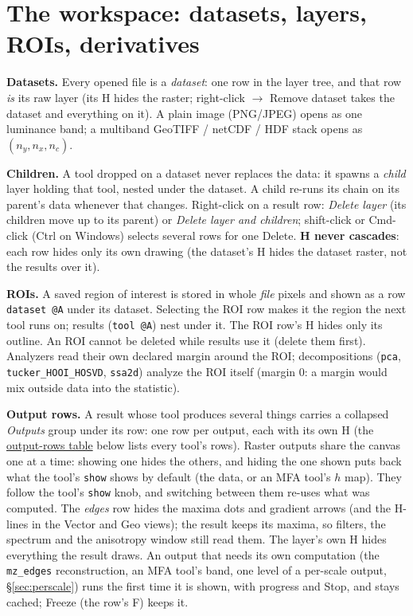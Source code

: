 \documentclass[10pt]{article}
\newcommand{\dev}[1]{\texttt{#1}}
\begin{document}
\tableofcontents

\section{The workspace: datasets, layers, ROIs, derivatives}\label{sec:workspace}

\textbf{Datasets.} Every opened file is a \emph{dataset}: one row in the layer tree, and
that row \emph{is} its raw layer (its H hides the raster; right-click $\to$ Remove dataset
takes the dataset and everything on it). A plain image (PNG/JPEG) opens as one luminance band;
a multiband GeoTIFF / netCDF / HDF stack opens as $(n_y,n_x,n_c)$.

\textbf{Children.} A tool dropped on a dataset never replaces the data: it spawns a
\emph{child} layer holding that tool, nested under the dataset. A child re-runs its chain on
its parent's data whenever that changes. Right-click on a result row: \emph{Delete layer}
(its children move up to its parent) or \emph{Delete layer and children}; shift-click or Cmd-click (Ctrl on Windows)
selects several rows for one Delete. \textbf{H never cascades}: each row hides only its own
drawing (the dataset's H hides the dataset raster, not the results over it).

\textbf{ROIs.} A saved region of interest is stored in whole \emph{file} pixels and shown as
a row \texttt{dataset @A} under its dataset. Selecting the ROI row makes it the region the
next tool runs on; results (\texttt{tool @A}) nest under it. The ROI row's H hides only its
outline. An ROI cannot be deleted while results use it (delete them first). Analyzers read
their own declared margin around the ROI; decompositions (\dev{pca},
\dev{tucker\_HOOI\_HOSVD}, \dev{ssa2d}) analyze the ROI itself (margin $0$: a margin would mix
outside data into the statistic).

\textbf{Output rows.} A result whose tool produces several things carries a collapsed
\emph{Outputs} group under its row: one row per output, each with its own H
(the \hyperref[tab:outputs]{output-rows table} below lists every tool's rows). Raster outputs share the canvas one at a time: showing one
hides the others, and hiding the one shown puts back what the tool's \texttt{show} shows by
default (the data, or an MFA tool's $h$ map). They follow the tool's
\texttt{show} knob, and switching between them re-uses what was computed. The \emph{edges} row
hides the maxima dots and gradient arrows (and the H-lines in the Vector and Geo views); the
result keeps its maxima, so filters, the spectrum and the anisotropy window still read them.
The layer's own H hides everything the result draws. An output that needs its own computation
(the \dev{mz\_edges} reconstruction, an MFA tool's band, one level of a per-scale output,
\S\ref{sec:perscale}) runs the first time it is shown, with progress and Stop,
and stays cached; Freeze (the row's F) keeps it.
\end{document}
